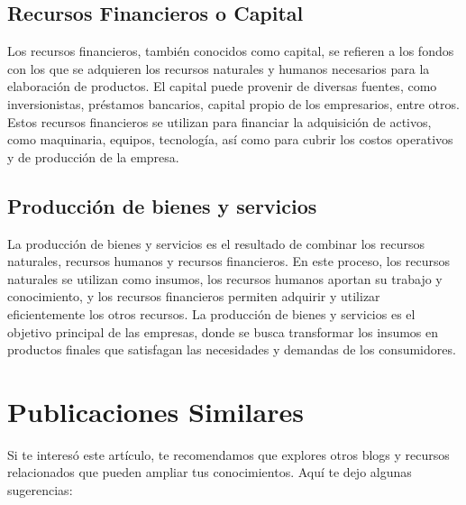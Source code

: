 \documentclass[
  man,
  floatsintext,
  longtable,
  a4paper,
  nolmodern,
  notxfonts,
  notimes,
  12pt,
  colorlinks=true,linkcolor=blue,citecolor=blue,urlcolor=blue]{apa7}
\begin{document}
\subsection{Recursos Financieros o
Capital}\label{recursos-financieros-o-capital}

Los recursos financieros, también conocidos como capital, se refieren a
los fondos con los que se adquieren los recursos naturales y humanos
necesarios para la elaboración de productos. El capital puede provenir
de diversas fuentes, como inversionistas, préstamos bancarios, capital
propio de los empresarios, entre otros. Estos recursos financieros se
utilizan para financiar la adquisición de activos, como maquinaria,
equipos, tecnología, así como para cubrir los costos operativos y de
producción de la empresa.

\subsection{Producción de bienes y
servicios}\label{producciuxf3n-de-bienes-y-servicios}

La producción de bienes y servicios es el resultado de combinar los
recursos naturales, recursos humanos y recursos financieros. En este
proceso, los recursos naturales se utilizan como insumos, los recursos
humanos aportan su trabajo y conocimiento, y los recursos financieros
permiten adquirir y utilizar eficientemente los otros recursos. La
producción de bienes y servicios es el objetivo principal de las
empresas, donde se busca transformar los insumos en productos finales
que satisfagan las necesidades y demandas de los consumidores.

\section{Publicaciones Similares}\label{publicaciones-similares}

Si te interesó este artículo, te recomendamos que explores otros blogs y
recursos relacionados que pueden ampliar tus conocimientos. Aquí te dejo
algunas sugerencias:
\end{document}
